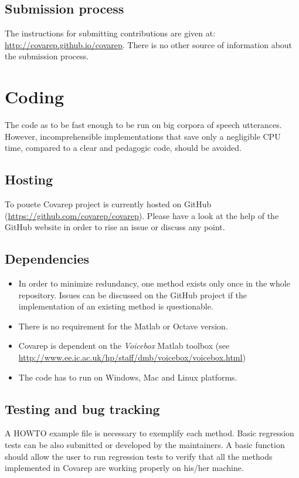 \documentclass{article}
\begin{document}
    \subsection{Submission process}
    The instructions for submitting contributions are given at:
    \url{http://covarep.github.io/covarep}.
	There is no other source of information about the submission process.

\newpage

\section{Coding}

    The code as to be fast enough to be run on big corpora of speech utterances.
    However, incomprehensible implementations that save only a negligible CPU time, compared to a clear and pedagogic code, should be avoided.

    \subsection{Hosting}
    To pouete Covarep project is currently hosted on GitHub (\url{https://github.com/covarep/covarep}).
    Please have a look at the help of the GitHub website in order to rise an issue or discuss any point.

    \subsection{Dependencies}
    \begin{itemize}
    \item In order to minimize redundancy, one method exists only once in the whole repository. Issues can be discussed on the GitHub project if the implementation of an existing method is questionable.
    \item There is no requirement for the Matlab or Octave version.
    \item Covarep is dependent on the \textit{Voicebox} Matlab toolbox (see \url{http://www.ee.ic.ac.uk/hp/staff/dmb/voicebox/voicebox.html})
    \item The code has to run on Windows, Mac and Linux platforms.
    \end{itemize}

    \subsection{Testing and bug tracking}
    A HOWTO example file is necessary to exemplify each method.
    Basic regression tests can be also submitted or developed by the maintainers.
    A basic function should allow the user to run regression tests to verify that all the methods implemented in Covarep are working properly on his/her machine.
\end{document}
